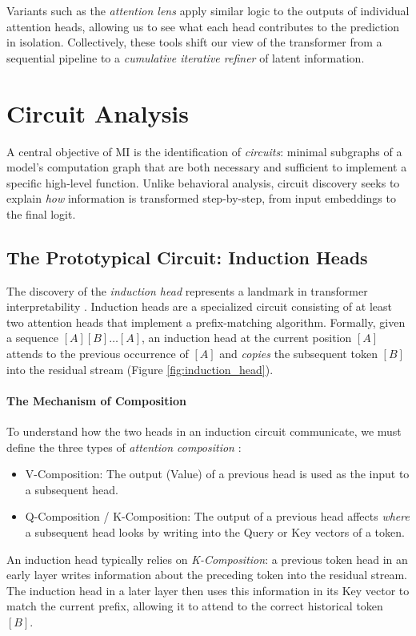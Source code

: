 Variants such as the \emph{attention lens} \citep{sakarvadia2023attention} apply similar logic to the outputs of individual attention heads, allowing us to see what each head contributes to the prediction in isolation. Collectively, these tools shift our view of the transformer from a sequential pipeline to a \emph{cumulative iterative refiner} of latent information.



\section{Circuit Analysis}

A central objective of MI is the identification of \emph{circuits}: minimal subgraphs of a model's computation graph that are both necessary and sufficient to implement a specific high-level function. Unlike behavioral analysis, circuit discovery seeks to explain \emph{how} information is transformed step-by-step, from input embeddings to the final logit.

\subsection{The Prototypical Circuit: Induction Heads}
The discovery of the \emph{induction head} represents a landmark in transformer interpretability \citep{olsson2022context}. Induction heads are a specialized circuit consisting of at least two attention heads that implement a prefix-matching algorithm. Formally, given a sequence $[A][B] \dots [A]$, an induction head at the current position $[A]$ attends to the previous occurrence of $[A]$ and \emph{copies} the subsequent token $[B]$ into the residual stream (Figure \ref{fig:induction_head}). 

\paragraph{The Mechanism of Composition}
To understand how the two heads in an induction circuit communicate, we must define the three types of \emph{attention composition} \citep{elhage2021mathematical}:
\begin{itemize}
    \item V-Composition: The output (Value) of a previous head is used as the input to a subsequent head.
    \item Q-Composition / K-Composition: The output of a previous head affects \emph{where} a subsequent head looks by writing into the Query or Key vectors of a token.
\end{itemize}
An induction head typically relies on \emph{K-Composition}: a previous token head in an early layer writes information about the preceding token into the residual stream. The induction head in a later layer then uses this information in its Key vector to match the current prefix, allowing it to attend to the correct historical token $[B]$.

